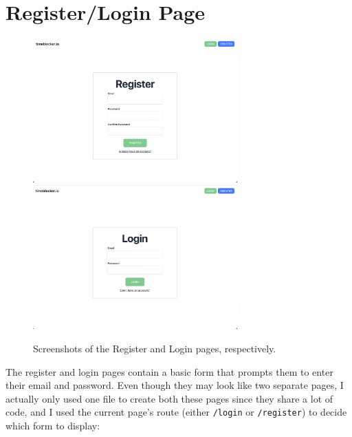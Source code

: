 \documentclass[notitlepage, 12pt]{report}
\newcommand{\code}[1]{\texttt{#1}}
\begin{document}
\newpage
\section*{Register/Login Page}

\begin{figure}[H]
	\centering
	\caption{Screenshots of the Register and Login pages, respectively.}
	\includegraphics[width=0.7\textwidth]{frontend-register-page.png}
	\includegraphics[width=0.7\textwidth]{frontend-login-page.png}
\end{figure}

The register and login pages contain a basic form that prompts them to enter their email and password. Even though they may look like two separate pages, I actually only used one file to create both these pages since they share a lot of code, and I used the current page's route (either \code{/login} or \code{/register}) to decide which form to display:
\end{document}
